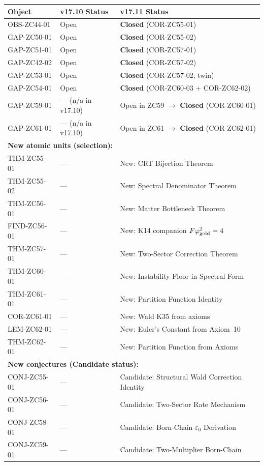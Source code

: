 \documentclass[12pt, a4paper]{article}
\begin{document}
\begin{keybox}[title={Status changes from v17.10 to v17.11}]
\begin{longtable}{@{}p{3.6cm}p{3.6cm}p{6.4cm}@{}}
\toprule
\textbf{Object} & \textbf{v17.10 Status} & \textbf{v17.11 Status}\\
\midrule
\endhead
OBS-ZC44-01 & Open & \textbf{Closed} (COR-ZC55-01)\\
GAP-ZC50-01 & Open & \textbf{Closed} (COR-ZC55-02)\\
GAP-ZC51-01 & Open & \textbf{Closed} (COR-ZC57-01)\\
GAP-ZC42-02 & Open & \textbf{Closed} (COR-ZC57-02)\\
GAP-ZC53-01 & Open & \textbf{Closed} (COR-ZC57-02, twin)\\
GAP-ZC54-01 & Open & \textbf{Closed} (COR-ZC60-03 + COR-ZC62-02)\\
GAP-ZC59-01 & --- (n/a in v17.10) & Open in ZC59 $\to$ \textbf{Closed} (COR-ZC60-01)\\
GAP-ZC61-01 & --- (n/a in v17.10) & Open in ZC61 $\to$ \textbf{Closed} (COR-ZC62-01)\\
\midrule
\multicolumn{3}{l}{\textbf{New atomic units (selection):}}\\
THM-ZC55-01 & --- & New: CRT Bijection Theorem\\
THM-ZC55-02 & --- & New: Spectral Denominator Theorem\\
THM-ZC56-01 & --- & New: Matter Bottleneck Theorem\\
FIND-ZC56-01 & --- & New: K14 companion $F\varphi_{\rm gold}^{2}=4$\\
THM-ZC57-01 & --- & New: Two-Sector Correction Theorem\\
THM-ZC60-01 & --- & New: Instability Floor in Spectral Form\\
THM-ZC61-01 & --- & New: Partition Function Identity\\
COR-ZC61-01 & --- & New: Wald K35 from axioms\\
LEM-ZC62-01 & --- & New: Euler's Constant from Axiom~10\\
THM-ZC62-01 & --- & New: Partition Function from Axioms\\
\midrule
\multicolumn{3}{l}{\textbf{New conjectures (Candidate status):}}\\
CONJ-ZC55-01 & --- & Candidate: Structural Wald Correction Identity\\
CONJ-ZC56-01 & --- & Candidate: Two-Sector Rate Mechanism\\
CONJ-ZC58-01 & --- & Candidate: Born-Chain $\varepsilon_0$ Derivation\\
CONJ-ZC59-01 & --- & Candidate: Two-Multiplier Born-Chain\\
\bottomrule
\end{longtable}
\end{keybox}
\end{document}
